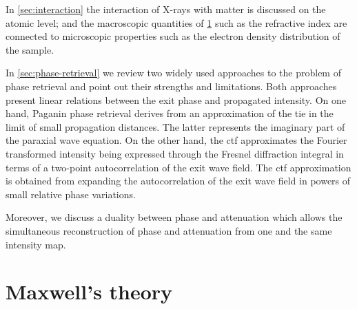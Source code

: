 \documentclass[
twoside,
openright,
titlepage,
numbers=noenddot,
headinclude,
fleqn,
a4paper,
footinclude=true,
cleardoublepage=empty,
abstractoff,
BCOR=5mm,
paper=a4,
fontsize=11pt,
british,ngerman,american,
]{scrreprt}
\begin{document}
In \cref{sec:interaction} the interaction of X-rays with matter is
discussed on the atomic level; and the macroscopic quantities of
\cref{sec:maxwell-theory} such as the refractive index are connected
to microscopic properties such as the electron density distribution of
the sample.

In \cref{sec:phase-retrieval} we review two widely used approaches to
the problem of phase retrieval and point out their strengths and
limitations.  Both approaches present linear relations between the
exit phase and propagated intensity.  On one hand, Paganin phase
retrieval derives from an approximation of the \acf{tie} in the limit
of small propagation distances.  The latter represents the imaginary
part of the paraxial wave equation.  On the other hand, the \acf{ctf}
approximates the Fourier transformed intensity being expressed through
the Fresnel diffraction integral in terms of a two-point
autocorrelation of the exit wave field.  The \ac{ctf} approximation is
obtained from expanding the autocorrelation of the exit wave field in
powers of small relative phase variations.

Moreover, we discuss a duality between phase and attenuation which
allows the simultaneous reconstruction of phase and attenuation from
one and the same intensity map.


\section{Maxwell's theory}
\label{sec:maxwell-theory}
\end{document}

